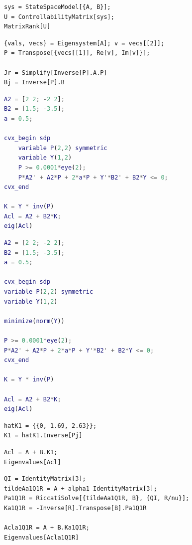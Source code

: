\documentclass[a4paper,12pt]{article}
\begin{document}
\begin{lstlisting}[caption={Матрица управляемости системы и ее ранг}, label={lst:U1}]
sys = StateSpaceModel[{A, B}];
U = ControllabilityMatrix[sys];
MatrixRank[U]
\end{lstlisting}

\begin{lstlisting}[caption={Жорданова форма системы}, label={lst:jordan1}]
{vals, vecs} = Eigensystem[A]; v = vecs[[2]];
P = Transpose[{vecs[[1]], Re[v], Im[v]}];

Jr = Simplify[Inverse[P].A.P]
Bj = Inverse[P].B
\end{lstlisting}

\begin{lstlisting}[caption={Решение LMI без задачи минимизации}, label={lst:cvx1}, language=Matlab]
A2 = [2 2; -2 2];
B2 = [1.5; -3.5];
a = 0.5;

cvx_begin sdp
	variable P(2,2) symmetric
	variable Y(1,2)
	P >= 0.0001*eye(2);
	P*A2' + A2*P + 2*a*P + Y'*B2' + B2*Y <= 0;
cvx_end

K = Y * inv(P)
Acl = A2 + B2*K;
eig(Acl)
\end{lstlisting}

\begin{lstlisting}[caption={Решение LMI с решением задачи минимизации}, label={lst:cvxmin1}, language=Matlab]
A2 = [2 2; -2 2];
B2 = [1.5; -3.5];
a = 0.5;

cvx_begin sdp
variable P(2,2) symmetric
variable Y(1,2)

minimize(norm(Y))

P >= 0.0001*eye(2);
P*A2' + A2*P + 2*a*P + Y'*B2' + B2*Y <= 0;
cvx_end

K = Y * inv(P)

Acl = A2 + B2*K;
eig(Acl)
\end{lstlisting}

\begin{lstlisting}[caption={Матрица \(K\) в исходном базисе}, label={lst:K1}]
hatK1 = {{0, 1.69, 2.63}};
K1 = hatK1.Inverse[Pj]
\end{lstlisting}

\begin{lstlisting}[caption={Собственные числа замкнутой системы}, label={lst:lEig1}]
Acl = A + B.K1;
Eigenvalues[Acl]
\end{lstlisting}

\begin{lstlisting}[caption={Решение матричного уравнения Риккати при \(Q = I\)}, label={lst:riccati1}]
QI = IdentityMatrix[3];
tildeAa1Q1R = A + alpha1 IdentityMatrix[3];
Pa1Q1R = RiccatiSolve[{tildeAa1Q1R, B}, {QI, R/nu}];
Ka1Q1R = -Inverse[R].Transpose[B].Pa1Q1R

Acla1Q1R = A + B.Ka1Q1R;
Eigenvalues[Acla1Q1R]
\end{lstlisting}
\end{document}

